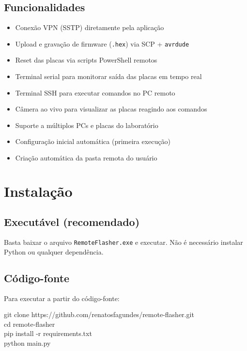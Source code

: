 \documentclass[12pt,a4paper]{article}
\begin{document}
\subsection{Funcionalidades}

\begin{itemize}[nosep]
  \item Conexão VPN (SSTP) diretamente pela aplicação
  \item Upload e gravação de firmware (\texttt{.hex}) via SCP + \texttt{avrdude}
  \item Reset das placas via scripts PowerShell remotos
  \item Terminal serial para monitorar saída das placas em tempo real
  \item Terminal SSH para executar comandos no PC remoto
  \item Câmera ao vivo para visualizar as placas reagindo aos comandos
  \item Suporte a múltiplos PCs e placas do laboratório
  \item Configuração inicial automática (primeira execução)
  \item Criação automática da pasta remota do usuário
\end{itemize}

\section{Instalação}

\subsection{Executável (recomendado)}

Basta baixar o arquivo \texttt{RemoteFlasher.exe} e executar. Não é necessário instalar Python ou qualquer dependência.

\subsection{Código-fonte}

Para executar a partir do código-fonte:

\begin{codigobox}
git clone https://github.com/renatosfagundes/remote-flasher.git\\
cd remote-flasher\\
pip install -r requirements.txt\\
python main.py
\end{codigobox}
\end{document}
